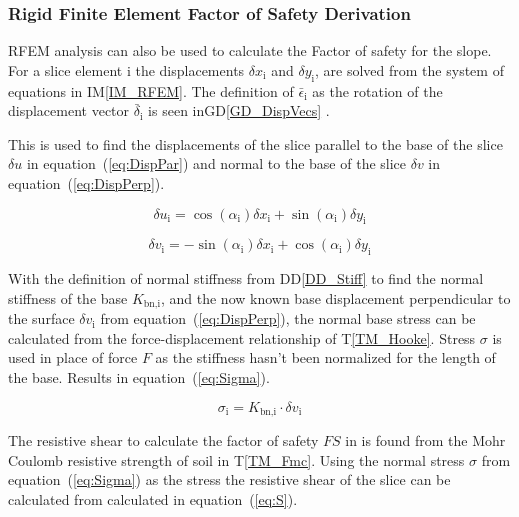 \documentclass[12pt]{article}
\newcommand{\tref}[1]{T\ref{#1}}
\newcommand{\iref}[1]{IM\ref{#1}}
\newcommand{\ddref}[1]{DD\ref{#1}}
\newcommand{\dref}[1]{GD\ref{#1}}
\begin{document}

\subsubsection*{Rigid Finite Element
  Factor of Safety Derivation}

\noindent
RFEM analysis can also be used to calculate the Factor of safety for
the slope.  For a slice element $\text{i}$ the displacements $\delta
x_{\text{i}}$ and $\delta y_{\text{i}}$, are solved from the system of
equations in \iref{IM_RFEM}. The definition of
$\bar{\epsilon}_\text{i}$ as the rotation of the displacement vector
$\bar{\delta}_\text{i}$ is seen in\dref{GD_DispVecs} .

This is used to find the displacements of the slice parallel to the
base of the slice $\delta u$ in equation~(\ref{eq:DispPar}) and normal
to the base of the slice $\delta v$ in equation~(\ref{eq:DispPerp}).

\begin{equation}\label{eq:DispPar}
\delta u_{\text{i}} = \cos\left(\alpha_{\text{i}}\right) \delta
x_{\text{i}} + \sin\left(\alpha_{\text{i}}\right) \delta y_{\text{i}}
\end{equation}

\begin{equation}\label{eq:DispPerp}
\delta v_{\text{i}} = -\sin\left(\alpha_{\text{i}}\right) \delta
x_{\text{i}} + \cos\left(\alpha_{\text{i}}\right) \delta y_{\text{i}}
\end{equation}

\noindent
With the definition of normal stiffness from \ddref{DD_Stiff} to find
the normal stiffness of the base $K_\text{bn,i}$, and the now known
base displacement perpendicular to the surface $\delta v_{\text{i}}$
from equation~(\ref{eq:DispPerp}), the normal base stress can be
calculated from the force-displacement relationship of
\tref{TM_Hooke}. Stress $\sigma$ is used in place of force $F$ as the
stiffness hasn't been normalized for the length of the base. Results in
equation~(\ref{eq:Sigma}).

\begin{equation}\label{eq:Sigma}
\sigma_{\text{i}} = K_{\text{bn,i}} \cdot \delta v_{\text{i}}
\end{equation}

\noindent
The resistive shear to calculate the factor of safety $FS$ in is found
from the Mohr Coulomb resistive strength of soil in
\tref{TM_Fmc}. Using the normal stress $\sigma$ from
equation~(\ref{eq:Sigma}) as the stress the resistive shear of the
slice can be calculated from calculated in equation~(\ref{eq:S}).
\end{document}
